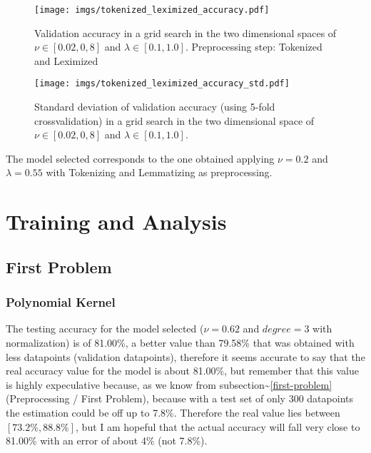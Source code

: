 \documentclass[format=acmtog]{acmart}
\begin{document}
\begin{figure}
\centering
\texttt{[image: imgs/tokenized\_leximized\_accuracy.pdf]}
\caption{Validation accuracy in a grid search in the two dimensional
spaces of \(\nu \in [0.02,0,8]\) and \(\lambda \in [0.1, 1.0]\).
Preprocessing step: Tokenized and Leximized
\label{tokenized_leximized_accuracy}}
\end{figure}

\begin{figure}
\centering
\texttt{[image: imgs/tokenized\_leximized\_accuracy\_std.pdf]}
\caption{Standard deviation of validation accuracy (using 5-fold
crossvalidation) in a grid search in the two dimensional space of
\(\nu \in [0.02,0,8]\) and \(\lambda \in [0.1, 1.0]\).
\label{tokenized_leximized_accuracy_std}}
\end{figure}

The model selected corresponds to the one obtained applying
\(\nu = 0.2\) and \(\lambda = 0.55\) with Tokenizing and Lemmatizing as
preprocessing.

\section{Training and Analysis}\label{training-and-analysis}

\subsection{First Problem}\label{first-problem-2}

\subsubsection{Polynomial Kernel}\label{polynomial-kernel}

The testing accuracy for the model selected (\(\nu = 0.62\) and
\(degree = 3\) with normalization) is of 81.00\%, a better value than
79.58\% that was obtained with less datapoints (validation datapoints),
therefore it seems accurate to say that the real accuracy value for the
model is about 81.00\%, but remember that this value is highly
expeculative because, as we know from
subsection\textasciitilde{}\ref{first-problem} (Preprocessing / First
Problem), because with a test set of only 300 datapoints the estimation
could be off up to 7.8\%. Therefore the real value lies between
\([73.2\% , 88.8\%]\), but I am hopeful that the actual accuracy will
fall very close to 81.00\% with an error of about 4\% (not 7.8\%).
\end{document}
